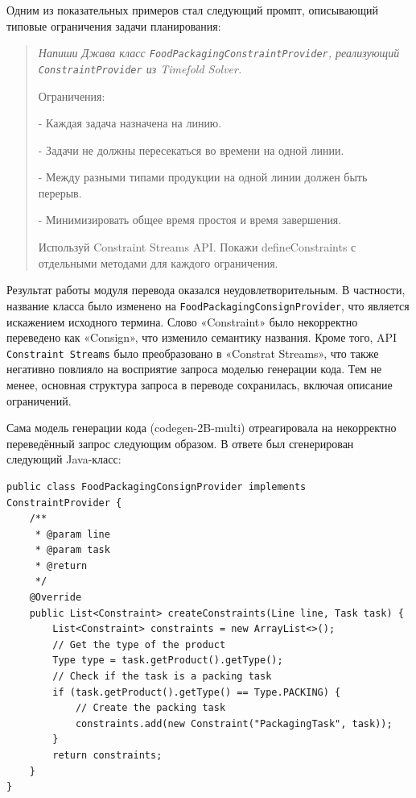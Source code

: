 Одним из показательных примеров стал следующий промпт, описывающий типовые ограничения задачи планирования:

\begin{quote}
{\itshape
Напиши Джава класс \texttt{FoodPackagingConstraintProvider}, реализующий \texttt{ConstraintProvider} из Timefold Solver.

Ограничения:

- Каждая задача назначена на линию.

- Задачи не должны пересекаться во времени на одной линии.

- Между разными типами продукции на одной линии должен быть перерыв.

- Минимизировать общее время простоя и время завершения.

Используй Constraint Streams API. Покажи defineConstraints с отдельными методами для каждого ограничения.
}
\end{quote}

Результат работы модуля перевода оказался неудовлетворительным. В частности, название класса было изменено на \texttt{FoodPackagingConsignProvider}, что является искажением исходного термина. Слово «Constraint» было некорректно переведено как «Consign», что изменило семантику названия. Кроме того, API \texttt{Constraint Streams} было преобразовано в «Constrat Streams», что также негативно повлияло на восприятие запроса моделью генерации кода. Тем не менее, основная структура запроса в переводе сохранилась, включая описание ограничений.

Сама модель генерации кода (codegen-2B-multi) отреагировала на некорректно переведённый запрос следующим образом. В ответе был сгенерирован следующий Java-класс:

\begin{lstlisting}[caption={Ограничение minimizeCleaningDuration}, label={lst:minimizeCleaningDuration}, basicstyle=\ttfamily\footnotesize, breaklines=true]
public class FoodPackagingConsignProvider implements ConstraintProvider {
    /**
     * @param line
     * @param task
     * @return
     */
    @Override
    public List<Constraint> createConstraints(Line line, Task task) {
        List<Constraint> constraints = new ArrayList<>();
        // Get the type of the product
        Type type = task.getProduct().getType();
        // Check if the task is a packing task
        if (task.getProduct().getType() == Type.PACKING) {
            // Create the packing task
            constraints.add(new Constraint("PackagingTask", task));
        }
        return constraints;
    }
}
\end{lstlisting}

